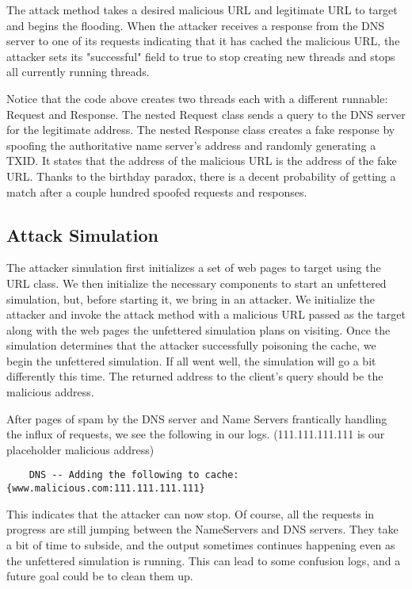 \documentclass[a4paper, 12pt]{article} %
\begin{document}
The attack method takes a desired malicious URL and legitimate URL to target and begins the flooding. When the attacker receives a response from the DNS server to one of its requests indicating that it has cached the malicious URL, the attacker sets its "successful" field to true to stop creating new threads and stops all currently running threads.

Notice that the code above creates two threads each with a different runnable: Request and Response. The nested Request class sends a query to the DNS server for the legitimate address. The nested Response class creates a fake response by spoofing the authoritative name server's address and randomly generating a TXID. It states that the address of the malicious URL is the address of the fake URL. Thanks to the birthday paradox, there is a decent probability of getting a match after a couple hundred spoofed requests and responses.

\subsection{Attack Simulation}

The attacker simulation first initializes a set of web pages to target using the URL class. We then initialize the necessary components to start an unfettered simulation, but, before starting it, we bring in an attacker. We initialize the attacker and invoke the attack method with a malicious URL passed as the target along with the web pages the unfettered simulation plans on visiting. Once the simulation determines that the attacker successfully poisoning the cache, we begin the unfettered simulation. If all went well, the simulation will go a bit differently this time. The returned address to the client's query should be the malicious address.

After pages of spam by the DNS server and Name Servers frantically handling the influx of requests, we see the following in our logs. (111.111.111.111 is our placeholder malicious address)

\begin{verbatim}
    DNS -- Adding the following to cache: {www.malicious.com:111.111.111.111}
\end{verbatim}

This indicates that the attacker can now stop. Of course, all the requests in progress are still jumping between the NameServers and DNS servers. They take a bit of time to subside, and the output sometimes continues happening even as the unfettered simulation is running. This can lead to some confusion logs, and a future goal could be to clean them up.
\end{document}
